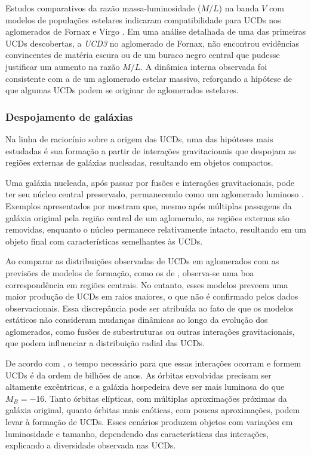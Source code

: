 Estudos comparativos da razão massa-luminosidade ($M/L$) na banda $V$ com modelos de populações estelares indicaram compatibilidade para UCDs nos aglomerados de Fornax \citep{Hilker_2006} e Virgo \citep{Evstigneeva_2007}. Em uma análise detalhada de uma das primeiras UCDs descobertas, a \textit{UCD3} no aglomerado de Fornax, \cite{Frank_2011} não encontrou evidências convincentes de matéria escura ou de um buraco negro central que pudesse justificar um aumento na razão $M/L$. A dinâmica interna observada foi consistente com a de um aglomerado estelar massivo, reforçando a hipótese de que algumas UCDs podem se originar de aglomerados estelares.

\subsubsection{Despojamento de galáxias}\label{subsubsec:Galaxy stripping}
Na linha de raciocínio sobre a origem das UCDs, uma das hipóteses mais estudadas é sua formação a partir de interações gravitacionais que despojam as regiões externas de galáxias nucleadas, resultando em objetos compactos.

Uma galáxia nucleada, após passar por fusões e interações gravitacionais, pode ter seu núcleo central preservado, permanecendo como um aglomerado luminoso \citep{Bassino_1994}. Exemplos apresentados por \cite{Bekki_2001} mostram que, mesmo após múltiplas passagens da galáxia original pela região central de um aglomerado, as regiões externas são removidas, enquanto o núcleo permanece relativamente intacto, resultando em um objeto final com características semelhantes às UCDs.

Ao comparar as distribuições observadas de UCDs em aglomerados com as previsões de modelos de formação, como os de \cite{Thomas_2008}, observa-se uma boa correspondência em regiões centrais. No entanto, esses modelos preveem uma maior produção de UCDs em raios maiores, o que não é confirmado pelos dados observacionais. Essa discrepância pode ser atribuída ao fato de que os modelos estáticos não consideram mudanças dinâmicas ao longo da evolução dos aglomerados, como fusões de subestruturas ou outras interações gravitacionais, que podem influenciar a distribuição radial das UCDs.

De acordo com \cite{Bekki_2003}, o tempo necessário para que essas interações ocorram e formem UCDs é da ordem de bilhões de anos. As órbitas envolvidas precisam ser altamente excêntricas, e a galáxia hospedeira deve ser mais luminosa do que $M_B = -16$. Tanto órbitas elípticas, com múltiplas aproximações próximas da galáxia original, quanto órbitas mais caóticas, com poucas aproximações, podem levar à formação de UCDs. Esses cenários produzem objetos com variações em luminosidade e tamanho, dependendo das características das interações, explicando a diversidade observada nas UCDs.

